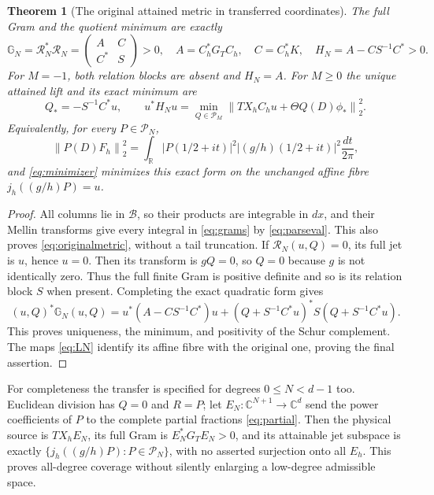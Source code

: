 \documentclass[11pt]{article}
\newtheorem{theorem}{Theorem}[section]
\newcommand{\C}{\mathbb C}\newcommand{\R}{\mathbb R}
\newcommand{\B}{\mathscr B}\newcommand{\HH}{\mathcal H}
\newcommand{\PP}{\mathcal P}\newcommand{\Fc}{\mathcal F_+}
\newcommand{\norm}[1]{\left\lVert#1\right\rVert}
\begin{document}
\begin{theorem}[The original attained metric in transferred coordinates]
\label{thm:gram}
The full Gram and the quotient minimum are exactly
\begin{equation}\label{eq:schur}
 \mathbb G_N=\mathcal R_N^*\mathcal R_N
   =\begin{pmatrix}A&C\\C^*&S\end{pmatrix}>0,
 \quad A=C_h^*G_TC_h,\quad C=C_h^*K,\quad
 H_N=A-CS^{-1}C^*>0.
\end{equation}
For $M=-1$, both relation blocks are absent and $H_N=A$.
For $M\geq0$ the unique attained lift and its exact minimum are
\begin{equation}\label{eq:minimizer}
 Q_*=-S^{-1}C^*u,\qquad
 u^*H_Nu=\min_{Q\in\PP_M}
          \norm{T X_hC_hu+\Theta Q(D)\phi_*}_2^2.
\end{equation}
Equivalently, for every $P\in\PP_N$,
\begin{equation}\label{eq:originalmetric}
 \norm{P(D)F_h}_2^2
  =\int_\R|P(1/2+it)|^2\left|(g/h)(1/2+it)\right|^2
                                                   \frac{dt}{2\pi},
\end{equation}
and \eqref{eq:minimizer} minimizes this exact form on the
unchanged affine fibre $j_h((g/h)P)=u$.
\end{theorem}
\begin{proof}
All columns lie in $\B$, so their products are integrable
in $dx$, and their Mellin transforms give every integral in
\eqref{eq:grams} by \eqref{eq:parseval}. This also proves
\eqref{eq:originalmetric}, without a tail truncation.
If $\mathcal R_N(u,Q)=0$, its full jet is $u$, hence $u=0$.
Then its transform is $gQ=0$, so $Q=0$ because $g$ is not
identically zero. Thus the full finite Gram is positive
definite and so is its relation block $S$ when present.
Completing the exact quadratic form gives
\[
 (u,Q)^*\mathbb G_N(u,Q)
 =u^*(A-CS^{-1}C^*)u
       +(Q+S^{-1}C^*u)^*S(Q+S^{-1}C^*u).
\]
This proves uniqueness, the minimum, and positivity of the
Schur complement. The maps \eqref{eq:LN} identify its affine
fibre with the original one, proving the final assertion.
\end{proof}

For completeness the transfer is specified for degrees
$0\leq N<d-1$ too. Euclidean division has $Q=0$ and $R=P$;
let $E_N:\C^{N+1}\to\C^d$ send the power coefficients of
$P$ to the complete partial fractions \eqref{eq:partial}.
Then the physical source is $TX_hE_N$, its full Gram is
$E_N^*G_TE_N>0$, and its attainable jet subspace is exactly
$\{j_h((g/h)P):P\in\PP_N\}$, with no asserted surjection
onto all $E_h$. This proves all-degree coverage without
silently enlarging a low-degree admissible space.
\end{document}
